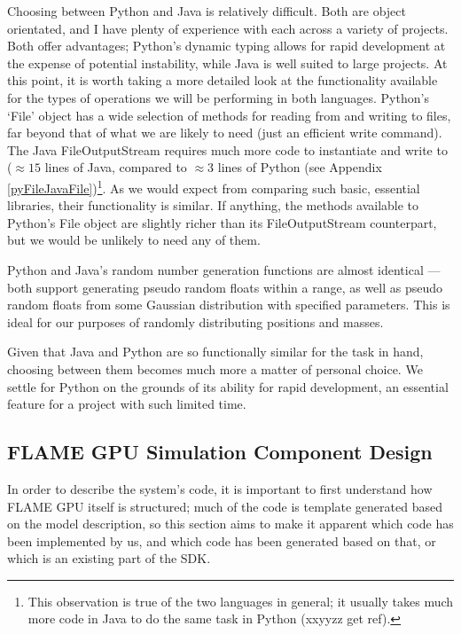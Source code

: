 \documentclass[11pt,a4paper]{article}
\begin{document}
Choosing between Python and Java is relatively difficult. Both are object orientated, and I have plenty of experience with each across a variety of projects. Both offer advantages; Python's dynamic typing allows for rapid development at the expense of potential instability, while Java is well suited to large projects. At this point, it is worth taking a more detailed look at the functionality available for the types of operations we will be performing in both languages. Python's `File' object has a wide selection of methods for reading from and writing to files, far beyond that of what we are likely to need (just an efficient write command). The Java FileOutputStream requires much more code to instantiate and write to ($\approx 15$ lines of Java, compared to $\approx 3$ lines of Python (see Appendix \ref{pyFileJavaFile})\footnote{This observation is true of the two languages in general; it usually takes much more code in Java to do the same task in Python (xxyyzz get ref).}. As we would expect from comparing such basic, essential libraries, their functionality is similar. If anything, the methods available to Python's File object are slightly richer than its FileOutputStream counterpart, but we would be unlikely to need any of them.

Python and Java's random number generation functions are almost identical --- both support generating pseudo random floats within a range, as well as pseudo random floats from some Gaussian distribution with specified parameters. This is ideal for our purposes of randomly distributing positions and masses.

Given that Java and Python are so functionally similar for the task in hand, choosing between them becomes much more a matter of personal choice. We settle for Python on the grounds of its ability for rapid development, an essential feature for a project with such limited time.


\subsection{FLAME GPU Simulation Component Design}

In order to describe the system's code, it is important to first understand how FLAME GPU itself is structured; much of the code is template generated based on the model description, so this section aims to make it apparent which code has been implemented by us, and which code has been generated based on that, or which is an existing part of the SDK.
\end{document}
